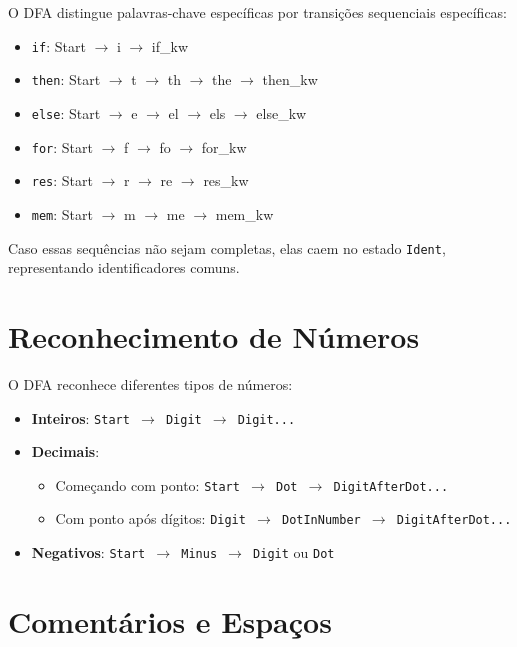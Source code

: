 \documentclass[a4paper,12pt]{article}
\begin{document}
O DFA distingue palavras-chave específicas por transições sequenciais específicas:

\begin{itemize}
    \item \texttt{if}: Start $\rightarrow$ i $\rightarrow$ if\_kw
    \item \texttt{then}: Start $\rightarrow$ t $\rightarrow$ th $\rightarrow$ the $\rightarrow$ then\_kw
    \item \texttt{else}: Start $\rightarrow$ e $\rightarrow$ el $\rightarrow$ els $\rightarrow$ else\_kw
    \item \texttt{for}: Start $\rightarrow$ f $\rightarrow$ fo $\rightarrow$ for\_kw
    \item \texttt{res}: Start $\rightarrow$ r $\rightarrow$ re $\rightarrow$ res\_kw
    \item \texttt{mem}: Start $\rightarrow$ m $\rightarrow$ me $\rightarrow$ mem\_kw
\end{itemize}

Caso essas sequências não sejam completas, elas caem no estado \texttt{Ident}, representando identificadores comuns.

\section*{Reconhecimento de Números}

O DFA reconhece diferentes tipos de números:

\begin{itemize}
    \item \textbf{Inteiros}: \texttt{Start $\rightarrow$ Digit $\rightarrow$ Digit...}
    \item \textbf{Decimais}:
        \begin{itemize}
            \item Começando com ponto: \texttt{Start $\rightarrow$ Dot $\rightarrow$ DigitAfterDot...}
            \item Com ponto após dígitos: \texttt{Digit $\rightarrow$ DotInNumber $\rightarrow$ DigitAfterDot...}
        \end{itemize}
    \item \textbf{Negativos}: \texttt{Start $\rightarrow$ Minus $\rightarrow$ Digit} ou \texttt{Dot}
\end{itemize}

\section*{Comentários e Espaços}
\end{document}

